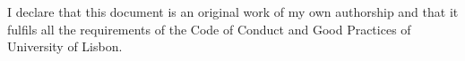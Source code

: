 \chapter*{ }
\vspace{4cm}

\begin{center}
{\huge {}}

\vspace{2cm}

I declare that this document is an original work of my own authorship and that 
it fulfils all the requirements of the Code of Conduct and Good Practices of \\University of Lisbon.
\end{center}

\clearpage
\thispagestyle{empty}
\cleardoublepage

